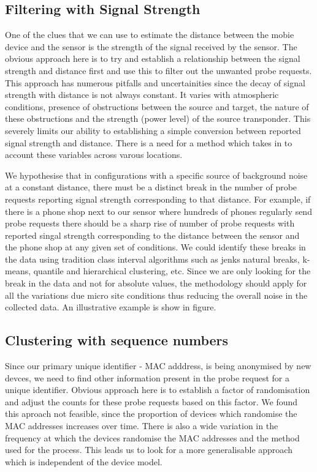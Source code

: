 \subsection{Filtering with Signal Strength}
One of the clues that we can use to estimate the distance between the mobie device and the sensor is the strength of the signal received by the sensor. 
The obvious approach here is to try and establish a relationship between the signal strength and distance first and use this to filter out the unwanted probe requests.
This approach has numerous pitfalls and uncertainities since the decay of signal strength with distance is not always constant.
It varies with atmospheric conditions, presence of obstructions between the source and target, the nature of these obstructions and the strength (power level) of the source transponder.
This severely limits our ability to establishing a simple conversion between reported signal strength and distance.
There is a need for a method which takes in to account these variables across varous locations.

We hypothesise that in configurations with a specific source of background noise at a constant distance, there must be a distinct break in the number of probe requests reporting signal strength corresponding to that distance.
For example, if there is a phone shop next to our sensor where hundreds of phones regularly send probe requests there should be a sharp rise of number of probe requests with reported singal strength corresponding to the distance between the sensor and the phone shop at any given set of conditions.
We could identify these breaks in the data using tradition class interval algorithms such as jenks natural breaks, k-means, quantile and hierarchical clustering, etc.
Since we are only looking for the break in the data and not for absolute values, the methodology should apply for all the variations due micro site conditions thus reducing the overall noise in the collected data.
An illustrative example is show in figure.

\subsection{Clustering with sequence numbers}

Since our primary unique identifier - MAC adddress, is being anonymised by new devces, we need to find other information present in the probe request for a unique identifier.
Obvious approach here is to establish a factor of randomisation and adjust the counts for these probe requests based on this factor.
We found this aproach not feasible, since the proportion of devices which randomise the MAC addresses increases over time.
There is also a wide variation in the frequency at which the devices randomise the MAC addresses and the method used for the process.
This leads us to look for a more generalisable approach which is independent of the device model.


